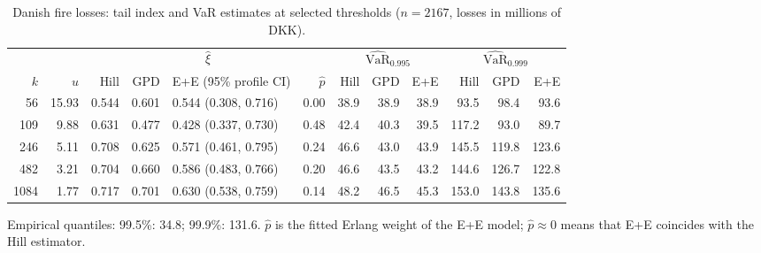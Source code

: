 \begin{table}[t]
\centering
\footnotesize
\setlength{\tabcolsep}{4pt}
\caption{Danish fire losses: tail index and VaR estimates at selected thresholds ($n=2167$, losses in millions of DKK).}
\label{tab:danish}
\begin{tabular}{rrrrlrrrrrrr}
\toprule
 & & \multicolumn{4}{c}{$\hat\xi$} & \multicolumn{3}{c}{$\widehat{\mathrm{VaR}}_{0.995}$} & \multicolumn{3}{c}{$\widehat{\mathrm{VaR}}_{0.999}$} \\
\cmidrule(lr){3-6} \cmidrule(lr){7-9} \cmidrule(lr){10-12}
$k$ & $u$ & Hill & GPD & E+E (95\% profile CI) & $\hat p$ & Hill & GPD & E+E & Hill & GPD & E+E \\
\midrule
56 & 15.93 & 0.544 & 0.601 & 0.544 (0.308, 0.716) & 0.00 & 38.9 & 38.9 & 38.9 & 93.5 & 98.4 & 93.6 \\
109 & 9.88 & 0.631 & 0.477 & 0.428 (0.337, 0.730) & 0.48 & 42.4 & 40.3 & 39.5 & 117.2 & 93.0 & 89.7 \\
246 & 5.11 & 0.708 & 0.625 & 0.571 (0.461, 0.795) & 0.24 & 46.6 & 43.0 & 43.9 & 145.5 & 119.8 & 123.6 \\
482 & 3.21 & 0.704 & 0.660 & 0.586 (0.483, 0.766) & 0.20 & 46.6 & 43.5 & 43.2 & 144.6 & 126.7 & 122.8 \\
1084 & 1.77 & 0.717 & 0.701 & 0.630 (0.538, 0.759) & 0.14 & 48.2 & 46.5 & 45.3 & 153.0 & 143.8 & 135.6 \\
\bottomrule
\end{tabular}
\par\smallskip
\parbox{\linewidth}{\footnotesize Empirical quantiles: 99.5\%: 34.8; 99.9\%: 131.6. $\hat p$ is the fitted Erlang weight of the E+E model; $\hat p\approx 0$ means that E+E coincides with the Hill estimator.}
\end{table}

